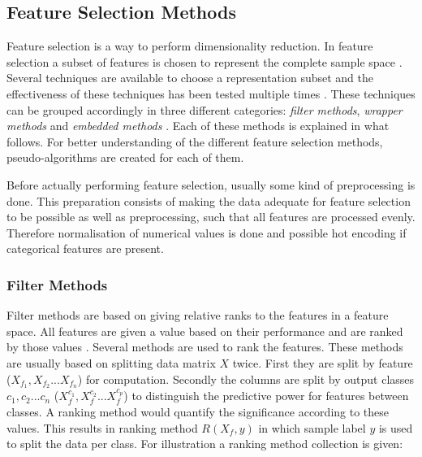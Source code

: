 \documentclass[10pt,a4paper]{report}
\begin{document}
	\subsection{Feature Selection Methods}
	\label{FSsubsec:FeatureSelectionMethods}
	
	Feature selection is a way to perform dimensionality reduction. In feature selection a subset of features is chosen to represent the complete sample space \cite{Guyon2006}. Several techniques are available to choose a representation subset and the effectiveness of these techniques has been tested multiple times \cite{CATAL20091040, molina2002feature, chandrasheto split bykar2014survey}. These techniques can be grouped accordingly in three different categories: \textit{filter methods}, \textit{wrapper methods} and \textit{embedded methods} \cite{saeys2007review}. Each of these methods is explained in what follows. For better understanding of the different feature selection methods, pseudo-algorithms are created for each of them.
	
	Before actually performing feature selection, usually some kind of preprocessing is done. This preparation consists of making the data adequate for feature selection to be possible as well as preprocessing, such that all features are processed evenly. Therefore normalisation of numerical values is done and possible hot encoding if categorical features are present. 
	
	\subsubsection{Filter Methods}
	\label{FSsubsec:FilterMethods}
	
	Filter methods are based on giving relative ranks to the features in a feature space. All features are given a value based on their performance and are ranked by those values \cite{Duch2006, saeys2007review}. Several methods are used to rank the features. These methods are usually based on splitting data matrix $X$ twice. First they are split by feature ($X_{f_1}, X_{f_2} ... X_{f_n}$) for computation. Secondly the columns are split by output classes $c_1, c_2 ... c_n$ ($X_{f}^{c_1}, X_{f}^{c_2} ... X_{f}^{c_p}$) to distinguish the predictive power for features between classes. A ranking method would quantify the significance according to these values. This results in ranking method $R(X_f, y)$ in which sample label $y$ is used to split the data per class. For illustration a ranking method collection is given:
	
\end{document}
